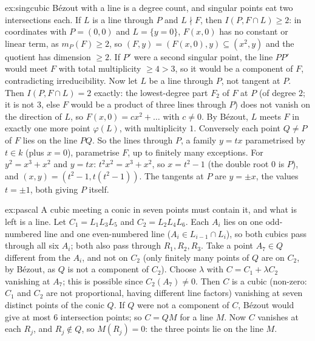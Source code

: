 \begin{solution}{ex:singcubic}
\idea Bézout with a line is a degree count, and singular points eat two intersections each.
\writeup If $L$ is a line through $P$ and $L\nmid F$, then $I(P,F\cap L)\ge2$: in coordinates with $P=(0,0)$ and $L=\{y=0\}$, $F(x,0)$ has no constant or
linear term, as $m_P(F)\ge2$, so $(F,y)=(F(x,0),y)\subseteq(x^2,y)$ and the quotient has dimension $\ge2$. If $P'$ were a second singular point, the line
$PP'$ would meet $F$ with total multiplicity $\ge4>3$, so it would be a component of $F$, contradicting irreducibility. Now let $L$ be a line through $P$,
not tangent at $P$. Then $I(P,F\cap L)=2$ exactly: the lowest-degree part $F_2$ of $F$ at $P$ (of degree $2$; it is not $3$, else $F$ would be a product of
three lines through $P$) does not vanish on the direction of $L$, so $F(x,0)=cx^2+\dots$ with $c\ne0$. By B\'ezout, $L$ meets $F$ in exactly one more point
$\varphi(L)$, with multiplicity $1$. Conversely each point $Q\ne P$ of $F$ lies on the line $PQ$. So the lines through $P$, a family $y=tx$
parametrised by $t\in k$ (plus $x=0$), parametrise $F$, up to finitely many exceptions. For $y^2=x^3+x^2$ and $y=tx$: $t^2x^2=x^3+x^2$, so $x=t^2-1$
(the double root $0$ is $P$), and $(x,y)=(t^2-1,t(t^2-1))$. The tangents at $P$ are $y=\pm x$, the values $t=\pm1$, both giving $P$ itself.
\end{solution}

\begin{solution}{ex:pascal}
\idea A cubic meeting a conic in seven points must contain it, and what is left is a line.
\writeup Let $C_1=L_1L_3L_5$ and $C_2=L_2L_4L_6$. Each $A_i$ lies on one odd-numbered line and one even-numbered line ($A_i\in L_{i-1}\cap L_i$), so both cubics
pass through all six $A_i$; both also pass through $R_1,R_2,R_3$. Take a point $A_7\in Q$ different from the $A_i$, and not on $C_2$ (only finitely many
points of $Q$ are on $C_2$, by B\'ezout, as $Q$ is not a component of $C_2$). Choose $\lambda$ with $C=C_1+\lambda C_2$ vanishing at $A_7$; this is possible
since $C_2(A_7)\ne0$. Then $C$ is a cubic (non-zero: $C_1$ and $C_2$ are not proportional, having different line factors) vanishing at seven distinct points of
the conic $Q$. If $Q$ were not a component of $C$, B\'ezout would give at most $6$ intersection points; so $C=QM$ for a line $M$. Now $C$ vanishes at each $R_j$,
and $R_j\notin Q$, so $M(R_j)=0$: the three points lie on the line $M$.
\end{solution}

